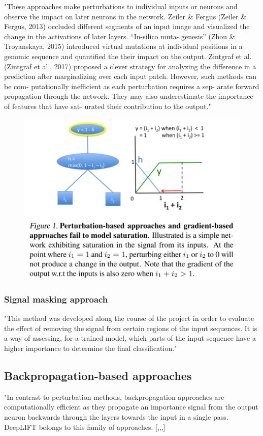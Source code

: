 \documentclass[]{scrartcl}
\begin{document}
"These approaches make perturbations to individual inputs or neurons and observe the impact on later neurons in the network. Zeiler \& Fergus (Zeiler \& Fergus, 2013) occluded different segments of an input image and visualized the change in the activations of later layers. “In-silico muta- genesis” (Zhou \& Troyanskaya, 2015) introduced virtual mutations at individual positions in a genomic sequence and quantified the their impact on the output. Zintgraf et al. (Zintgraf et al., 2017) proposed a clever strategy for analyzing the difference in a prediction after marginalizing over each input patch. However, such methods can be com- putationally inefficient as each perturbation requires a sep- arate forward propagation through the network. They may also underestimate the importance of features that have sat- urated their contribution to the output." \cite{Shrikumar2017}
\begin{figure}[h]
	\centering
	\includegraphics[width=0.6\linewidth]{saturation}
\end{figure}
\subsubsection{Signal masking approach}
"This method was developed along the course of the project in order to evaluate the effect of removing the signal from certain regions of the input sequences. It is a way of assessing, for a trained model, which parts of the input sequence have a higher importance to determine the final classification." \cite{Fontal2017}

\subsection{Backpropagation-based approaches}
"In contrast to perturbation methods, backpropagation approaches are computationally efficient as they propagate an importance signal from the output neuron backwards through the layers towards the input in a single pass.
DeepLIFT belongs to this family of approaches.
[,,,]
\end{document}
